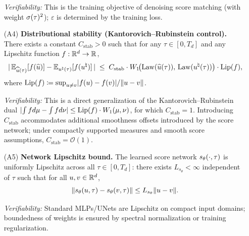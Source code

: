 \begin{enumerate}
\textit{Verifiability:} This is the training objective of denoising score matching \citep{vincent2011connection} (with weight $\sigtau^{2}$); $\varepsilon$ is determined by the training loss.

\item[(A4)] \textbf{Distributional stability (Kantorovich--Rubinstein control).} There exists a constant $C_{\mathrm{stab}} > 0$ such that for any $\tau \in [0, T_{d}]$ and any Lipschitz function $f: \mathbb{R}^{d} \to \mathbb{R}$,
\begin{equation}
\lvert \,\mathbb{E}_{\widehat{u}(\tau)}[f(\widehat{u})] - \mathbb{E}_{u^{\natural}(\tau)}[f(u^{\natural})]\, \rvert
\;\le\;
C_{\mathrm{stab}} \cdot W_{1}\!\bigl(\mathrm{Law}(\widehat{u}(\tau)),\, \mathrm{Law}(u^{\natural}(\tau))\bigr) \cdot \mathrm{Lip}(f),
\label{eq:thm2-assum-A4}
\end{equation}
where $\mathrm{Lip}(f) \coloneqq \sup_{u \neq v} \lvert f(u) - f(v) \rvert / \lVert u - v \rVert$.

\textit{Verifiability:} This is a direct generalization of the Kantorovich--Rubinstein dual $\lvert \int f d\mu - \int f d\nu \rvert \le \mathrm{Lip}(f) \cdot W_{1}(\mu, \nu)$, for which $C_{\mathrm{stab}} = 1$. Introducing $C_{\mathrm{stab}}$ accommodates additional smoothness offsets introduced by the score network; under compactly supported measures and smooth score assumptions, $C_{\mathrm{stab}} = \mathcal{O}(1)$.

\item[(A5)] \textbf{Network Lipschitz bound.} The learned score network $s_{\theta}(\cdot, \tau)$ is uniformly Lipschitz across all $\tau \in [0, T_{d}]$: there exists $L_{s_{\theta}} < \infty$ independent of $\tau$ such that for all $u, v \in \mathbb{R}^{d}$,
\begin{equation}
\lVert s_{\theta}(u, \tau) - s_{\theta}(v, \tau) \rVert \le L_{s_{\theta}} \lVert u - v \rVert.
\label{eq:thm2-assum-A5}
\end{equation}

\textit{Verifiability:} Standard MLPs/UNets are Lipschitz on compact input domains; boundedness of weights is ensured by spectral normalization or training regularization.
\end{enumerate}


